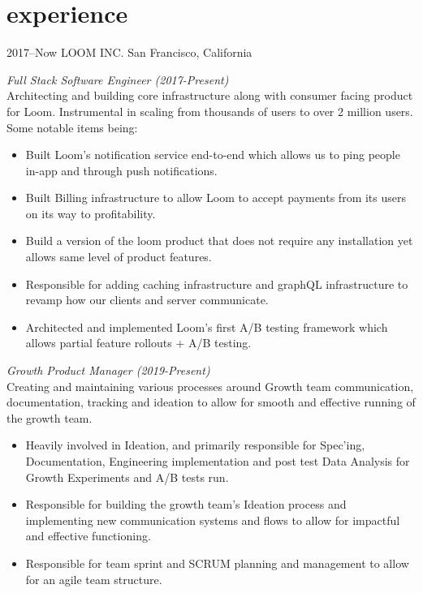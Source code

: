 \documentclass[print]{friggeri-cv} %
\begin{document}
\section{experience}
\begin{entrylist}
\entry
{2017--Now}
{LOOM INC.}
{San Francisco, California}
{\emph{Full Stack Software Engineer (2017-Present)} \\
Architecting and building core infrastructure along with consumer facing product for Loom. Instrumental in scaling from thousands of users to over 2 million users. Some notable items being:
\begin{itemize}
\item Built Loom's notification service end-to-end which allows us to ping people in-app and through push notifications.
\item Built Billing infrastructure to allow Loom to accept payments from its users on its way to profitability.
\item Build a version of the loom product that does not require any installation yet allows same level of product features.
\item Responsible for adding caching infrastructure and graphQL infrastructure to revamp how our clients and server communicate.
\item Architected and implemented Loom's first A/B testing framework which allows partial feature rollouts + A/B testing. \\

\end{itemize} 

\emph{Growth Product Manager (2019-Present)} \\
Creating and maintaining various processes around Growth team communication, documentation, tracking and ideation to allow for smooth and effective running of the growth team.
\begin{itemize}
\item Heavily involved in Ideation, and primarily responsible for Spec'ing, Documentation, Engineering implementation and post test Data Analysis for Growth Experiments and A/B tests run.
\item Responsible for building the growth team's Ideation process and implementing new communication systems and flows to allow for impactful and effective functioning.
\item Responsible for team sprint and SCRUM planning and management to allow for an agile team structure.
\end{itemize}
}

\end{entrylist}
\end{document}
